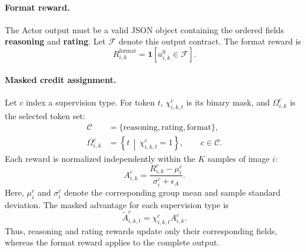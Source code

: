 \documentclass[letterpaper]{article} %
\begin{document}
\paragraph{Format reward.}
The Actor output must be a valid JSON object containing the ordered fields
\textbf{reasoning} and \textbf{rating}. Let $\mathcal{F}$ denote this output
contract. The format reward is
\begin{equation}
    R_{i,k}^{\mathrm{format}}
    =
    \mathbf{1}\!\left[a_{i,k}^0\in\mathcal{F}\right].
    \label{eq:format-reward}
\end{equation}

\paragraph{Masked credit assignment.}
Let $c$ index a supervision type. For token $t$, $\chi_{i,k,t}^c$ is its binary
mask, and $\Omega_{i,k}^c$ is the selected token set:
\begin{equation}
\begin{aligned}
    \mathcal{C}
        &=
        \{\mathrm{reasoning},\mathrm{rating},\mathrm{format}\},\\
    \Omega_{i,k}^c
        &=
        \left\{t\,\middle|\,\chi_{i,k,t}^c=1\right\},
        \qquad c\in\mathcal{C}.
\end{aligned}
    \label{eq:credit-token-set}
\end{equation}
Each reward is normalized independently within the $K$ samples of image $i$:
\begin{equation}
    A_{i,k}^c
        =\frac{R_{i,k}^c-\mu_i^c}{\sigma_i^c+\epsilon_A}.
    \label{eq:reward-wise-advantage}
\end{equation}
Here, $\mu_i^c$ and $\sigma_i^c$ denote the corresponding group mean and sample
standard deviation. The masked advantage for each supervision type is
\begin{equation}
    \widetilde A_{i,k,t}^c
    =
    \chi_{i,k,t}^c A_{i,k}^c.
    \label{eq:token-level-credit}
\end{equation}
Thus, reasoning and rating rewards update only their corresponding fields,
whereas the format reward applies to the complete output.
\end{document}
